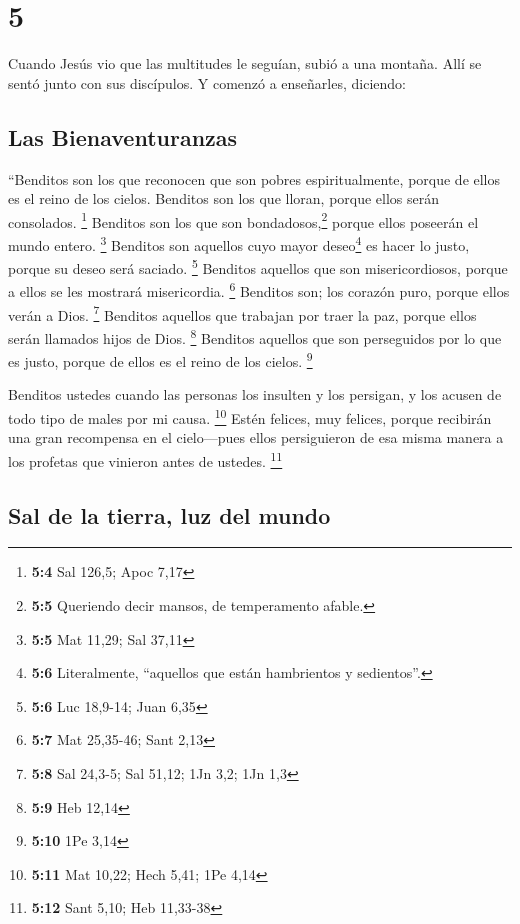 \hypertarget{section-4}{%
\section{5}\label{section-4}}

 Cuando Jesús vio que las multitudes le seguían, subió a
una montaña. Allí se sentó junto con sus discípulos.  Y
comenzó a enseñarles, diciendo:

\hypertarget{las-bienaventuranzas}{%
\subsection{Las Bienaventuranzas}\label{las-bienaventuranzas}}

 ``Benditos son los que reconocen que son pobres
espiritualmente, porque de ellos es el reino de los cielos.
 Benditos son los que lloran, porque ellos serán
consolados. \footnote{\textbf{5:4} Sal 126,5; Apoc 7,17} 
Benditos son los que son bondadosos,\footnote{\textbf{5:5} Queriendo
  decir mansos, de temperamento afable.} porque ellos poseerán el mundo
entero. \footnote{\textbf{5:5} Mat 11,29; Sal 37,11} 
Benditos son aquellos cuyo mayor deseo\footnote{\textbf{5:6}
  Literalmente, ``aquellos que están hambrientos y sedientos''.} es
hacer lo justo, porque su deseo será saciado. \footnote{\textbf{5:6} Luc
  18,9-14; Juan 6,35}  Benditos aquellos que son
misericordiosos, porque a ellos se les mostrará misericordia.
\footnote{\textbf{5:7} Mat 25,35-46; Sant 2,13}  Benditos
son; los corazón puro, porque ellos verán a Dios. \footnote{\textbf{5:8}
  Sal 24,3-5; Sal 51,12; 1Jn 3,2; 1Jn 1,3}  Benditos
aquellos que trabajan por traer la paz, porque ellos serán llamados
hijos de Dios. \footnote{\textbf{5:9} Heb 12,14} 
Benditos aquellos que son perseguidos por lo que es justo, porque de
ellos es el reino de los cielos. \footnote{\textbf{5:10} 1Pe 3,14}

 Benditos ustedes cuando las personas los insulten y los
persigan, y los acusen de todo tipo de males por mi causa. \footnote{\textbf{5:11}
  Mat 10,22; Hech 5,41; 1Pe 4,14}  Estén felices, muy
felices, porque recibirán una gran recompensa en el cielo---pues ellos
persiguieron de esa misma manera a los profetas que vinieron antes de
ustedes. \footnote{\textbf{5:12} Sant 5,10; Heb 11,33-38}

\hypertarget{sal-de-la-tierra-luz-del-mundo}{%
\subsection{Sal de la tierra, luz del
mundo}\label{sal-de-la-tierra-luz-del-mundo}}

